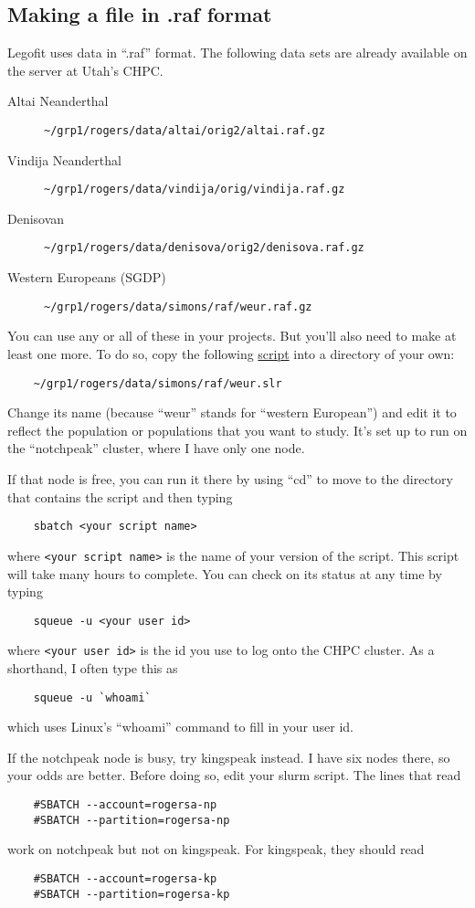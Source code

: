 \documentclass[11pt]{article}
\begin{document}
\subsection{Making a file in .raf format}
Legofit uses data in ``.raf'' format. The following data sets are
already available on the server at Utah's CHPC.
\begin{description}
\item[Altai Neanderthal]
\verb|~/grp1/rogers/data/altai/orig2/altai.raf.gz|

\item[Vindija Neanderthal]
\verb|~/grp1/rogers/data/vindija/orig/vindija.raf.gz|

\item[Denisovan]
\verb|~/grp1/rogers/data/denisova/orig2/denisova.raf.gz|

\item[Western Europeans (SGDP)]
\verb|~/grp1/rogers/data/simons/raf/weur.raf.gz|
\end{description}
You can use any or all of these in your projects. But you'll also need
to make at least one more. To do so, copy the following
\href{weur.slr.html}{script} into a directory of your own:
\begin{verbatim}
    ~/grp1/rogers/data/simons/raf/weur.slr
\end{verbatim}
Change its name (because ``weur'' stands for ``western European'') and
edit it to reflect the population or populations that you want to
study. It's set up to run on the ``notchpeak'' cluster, where I have
only one node.

If that node is free, you can run it there by using ``cd'' to move to
the directory that contains the script and then typing
\begin{verbatim}
    sbatch <your script name>
\end{verbatim}
where \verb|<your script name>| is the name of your version of the
script. This script will take many hours to complete. You can check on
its status at any time by typing
\begin{verbatim}
    squeue -u <your user id>
\end{verbatim}
where \verb|<your user id>| is the id you use to log onto the CHPC cluster.
As a shorthand, I often type this as
\begin{verbatim}
    squeue -u `whoami`
\end{verbatim}
which uses Linux's ``whoami'' command to fill in your user id.

If the notchpeak node is busy, try kingspeak instead. I have six nodes
there, so your odds are better. Before doing so, edit your slurm
script. The lines that read
\begin{verbatim}
    #SBATCH --account=rogersa-np
    #SBATCH --partition=rogersa-np
\end{verbatim}
work on notchpeak but not on kingspeak. For kingspeak, they should read
\begin{verbatim}
    #SBATCH --account=rogersa-kp
    #SBATCH --partition=rogersa-kp
\end{verbatim}
\end{document}
